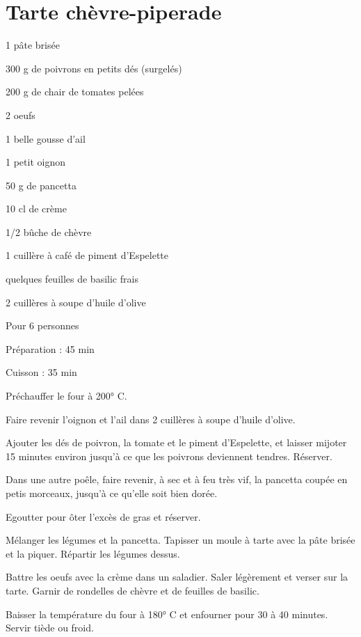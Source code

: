 \section[\normalsize{Tarte ch\`evre-piperade}]{Tarte ch\`evre-piperade}

\begin{ingredients}
\item 1 p\^ate bris\'ee
\item 300 g de poivrons en petits d\'es (surgel\'es)
\item 200 g de chair de tomates pel\'ees
\item 2 oeufs
\item 1 belle gousse d'ail
\item 1 petit oignon
\item 50 g de pancetta
\item 10 cl de cr\`eme
\item 1/2 bûche de ch\`evre
\item 1 cuill\`ere \`a caf\'e de piment d'Espelette 
\item quelques feuilles de basilic frais
\item 2 cuill\`eres \`a soupe d'huile d'olive
\end{ingredients}
\begin{infos}
\item Pour 6 personnes
\item Préparation : 45 min
\item Cuisson : 35 min
\end{infos}
\begin{etapes}
\item Pr\'echauffer le four \`a 200° C. 
\item Faire revenir l'oignon et l'ail dans 2 cuill\`eres \`a soupe d'huile d'olive. 
\item Ajouter les d\'es de poivron, la tomate et le piment d'Espelette, et laisser mijoter 15 minutes environ jusqu'\`a ce que les poivrons deviennent tendres. R\'eserver. 
\item Dans une autre po\^ele, faire revenir, \`a sec et \`a feu tr\`es vif, la pancetta coup\'ee en petis morceaux, jusqu'\`a ce qu'elle soit bien dor\'ee. 
\item Egoutter pour ôter l'exc\`es de gras et r\'eserver.
\item M\'elanger les l\'egumes et la pancetta. Tapisser un moule \`a tarte avec la p\^ate bris\'ee et la piquer. R\'epartir les l\'egumes dessus.
\item Battre les oeufs avec la cr\`eme dans un saladier. Saler l\'eg\`erement et verser sur la tarte. Garnir de rondelles de ch\`evre et de feuilles de basilic.
\item Baisser la temp\'erature du four \`a 180° C et enfourner pour 30 \`a 40 minutes. Servir ti\`ede ou froid.
\end{etapes}
\begin{conseils}
\end{conseils}
